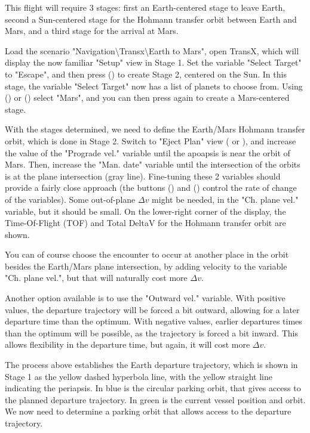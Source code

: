 \documentclass[Orbiter User Manual.tex]{subfiles}
\begin{document}
This flight will require 3 stages: first an Earth-centered stage to leave Earth,
second a Sun-centered stage for the Hohmann transfer orbit between Earth and
Mars, and a third stage for the arrival at Mars.

Load the scenario "Navigation\textbackslash Transx\textbackslash Earth to Mars",
open TransX, which will display the now familiar "Setup" view in Stage 1. Set
the variable "Select Target" to "Escape", and then press 
() to create Stage 2, centered on the Sun. In this stage, the variable
"Select Target" now has a list of planets to choose from. Using \mfdbtn{++}
(\mfdkey{=}) or \mfdbtn{-{}-} (\mfdkey{-}) select "Mars", and you can then press
 again to create a Mars-centered stage.

With the stages determined, we need to define the Earth/Mars Hohmann transfer
orbit, which is done in Stage 2. Switch to "Eject Plan" view ( or
), and increase the value of the "Prograde vel." variable until the
apoapsis is near the orbit of Mars. Then, increase the "Man. date" variable
until the intersection of the orbits is at the plane intersection (gray line).
Fine-tuning these 2 variables should provide a fairly close approach (the
buttons  (\mfdkey{\{}) and  (\mfdkey{\}}) control the
rate of change of the variables). Some out-of-plane $\Delta v$ might be needed,
in the "Ch. plane vel." variable, but it should be small. On the lower-right
corner of the display, the Time-Of-Flight (TOF) and Total DeltaV for the Hohmann
transfer orbit are shown.

You can of course choose the encounter to occur at another place in the orbit
besides the Earth/Mars plane intersection, by adding velocity to the variable
"Ch. plane vel.", but that will naturally cost more $\Delta v$.

Another option available is to use the "Outward vel." variable. With positive
values, the departure trajectory will be forced a bit outward, allowing for a
later departure time than the optimum. With negative values, earlier departures
times than the optimum will be possible, as the trajectory is forced a bit
inward. This allows flexibility in the departure time, but again, it will cost
more $\Delta v$.

The process above establishes the Earth departure trajectory, which is shown in
Stage 1 as the yellow dashed hyperbola line, with the yellow straight line
indicating the periapsis. In blue is the circular parking orbit, that gives
access to the planned departure trajectory. In green is the current vessel
position and orbit. We now need to determine a parking orbit that allows access
to the departure trajectory.
\end{document}
